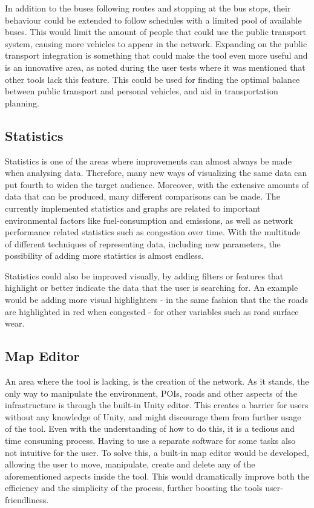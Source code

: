         In addition to the buses following routes and stopping at the bus stops, their behaviour could be extended to follow schedules with a limited pool of available buses. This would limit the amount of people that could use the public transport system, causing more vehicles to appear in the network. Expanding on the public transport integration is something that could make the tool even more useful and is an innovative area, as noted during the user tests where it was mentioned that other tools lack this feature. This could be used for finding the optimal balance between public transport and personal vehicles, and aid in transportation planning.

    \subsection{Statistics}
        Statistics is one of the areas where improvements can almost always be made when analysing data. Therefore, many new ways of visualizing the same data can put fourth to widen the target audience. Moreover, with the extensive amounts of data that can be produced, many different comparisons can be made. The currently implemented statistics and graphs are related to important environmental factors like fuel-consumption and emissions, as well as network performance related statistics such as congestion over time. With the multitude of different techniques of representing data, including new parameters, the possibility of adding more statistics is almost endless.

        Statistics could also be improved visually, by adding filters or features that highlight or better indicate the data that the user is searching for. An example would be adding more visual highlighters - in the same fashion that the the roads are highlighted in red when congested - for other variables such as road surface wear.

    \subsection{Map Editor}
        An area where the tool is lacking, is the creation of the network. As it stands, the only way to manipulate the environment, POIs, roads and other aspects of the infrastructure is through the built-in Unity editor. This creates a barrier for users without any knowledge of Unity, and might discourage them from further usage of the tool. Even with the understanding of how to do this, it is a tedious and time consuming process. Having to use a separate software for some tasks also not intuitive for the user. To solve this, a built-in map editor would be developed, allowing the user to move, manipulate, create and delete any of the aforementioned aspects inside the tool. This would dramatically improve both the efficiency and the simplicity of the process, further boosting the tools user-friendliness.